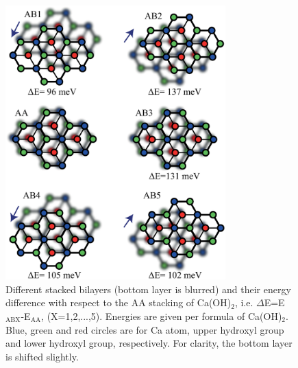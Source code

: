 \begin{figure}
\centering
\includegraphics[width=8.5cm]{stack_caoh2.eps}
\caption{\label{fig:stack_caoh2} Different stacked bilayers (bottom layer is blurred)
and their energy difference with respect to the AA stacking of Ca(OH)$_2$, i.e.
$\Delta$E=E$_{\text{ABX}}$-E$_{\text{AA}}$, (X=1,2,...,5). Energies are given
per formula of Ca(OH)$_2$. Blue, green and red circles are for Ca atom, 
upper hydroxyl group and lower hydroxyl group, respectively. For clarity, the 
bottom layer is shifted slightly.}
\end{figure}

